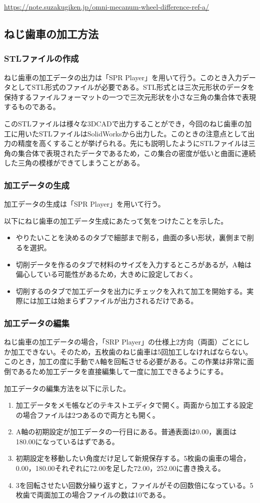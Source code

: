 \documentclass[dvipdfmx]{jsarticle}
\begin{document}
\url{https://note.suzakugiken.jp/omni-mecanum-wheel-difference-ref-a/}

\subsection{ねじ歯車の加工方法}
\subsubsection{STLファイルの作成}
ねじ歯車の加工データの出力は「SPR Player」を用いて行う。このとき入力データとしてSTL形式のファイルが必要である。STL形式とは三次元形状のデータを保持するファイルフォーマットの一つで三次元形状を小さな三角の集合体で表現するものである。

このSTLファイルは様々な3DCADで出力することができ，今回のねじ歯車の加工に用いたSTLファイルはSolidWorksから出力した。このときの注意点として出力の精度を高くすることが挙げられる。先にも説明したようにSTLファイルは三角の集合体で表現されたデータであるため，この集合の密度が低いと曲面に連続した三角の模様ができてしまうことがある。

\subsubsection{加工データの生成}
加工データの生成は「SPR Player」を用いて行う。

以下にねじ歯車の加工データ生成にあたって気をつけたことを示した。
\begin{itemize}
    \item やりたいことを決めるのタブで細部まで削る，曲面の多い形状，裏側まで削るを選択。
    \item 切削データを作るのタブで材料のサイズを入力するところがあるが，A軸は偏心している可能性があるため，大きめに設定しておく。
    \item 切削するのタブで加工データを出力にチェックを入れて加工を開始する。実際には加工は始まらずファイルが出力されるだけである。
\end{itemize}
\subsubsection{加工データの編集}
ねじ歯車の加工データの場合，「SRP Player」の仕様上2方向（両面）ごとにしか加工できない。そのため，五枚歯のねじ歯車は5回加工しなければならない。このとき，加工の度に手動でA軸を回転させる必要がある。この作業は非常に面倒であるため加工データを直接編集して一度に加工できるようにする。

加工データの編集方法を以下に示した。
\begin{enumerate}
    \item 加工データをメモ帳などのテキストエディタで開く。両面から加工する設定の場合ファイルは2つあるので両方とも開く。
    \item A軸の初期設定が加工データの一行目にある。普通表面は0.00，裏面は180.00になっているはずである。
    \item 初期設定を移動したい角度だけ足して新規保存する。5枚歯の歯車の場合，0.00，180.00それぞれに72.00を足した72.00，252.00に書き換える。
    \item 3を回転させたい回数分繰り返すと，ファイルがその回数倍になっている。5枚歯で両面加工の場合ファイルの数は10である。
\end{enumerate}
\end{document}
